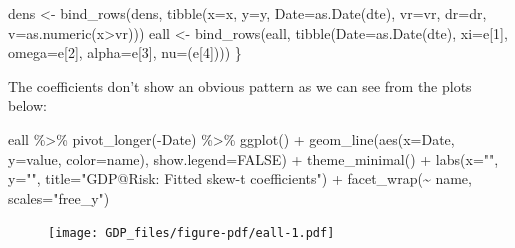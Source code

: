 \documentclass[
  letterpaper,
]{book}
\newenvironment{Shaded}{\begin{snugshade}}{\end{snugshade}}
\newcommand{\AttributeTok}[1]{\textcolor[rgb]{0.40,0.45,0.13}{#1}}
\newcommand{\ConstantTok}[1]{\textcolor[rgb]{0.56,0.35,0.01}{#1}}
\newcommand{\DecValTok}[1]{\textcolor[rgb]{0.68,0.00,0.00}{#1}}
\newcommand{\FunctionTok}[1]{\textcolor[rgb]{0.28,0.35,0.67}{#1}}
\newcommand{\NormalTok}[1]{\textcolor[rgb]{0.00,0.23,0.31}{#1}}
\newcommand{\OtherTok}[1]{\textcolor[rgb]{0.00,0.23,0.31}{#1}}
\newcommand{\SpecialCharTok}[1]{\textcolor[rgb]{0.37,0.37,0.37}{#1}}
\newcommand{\StringTok}[1]{\textcolor[rgb]{0.13,0.47,0.30}{#1}}
\begin{document}
\begin{Shaded}
\begin{Highlighting}[]
\NormalTok{  dens }\OtherTok{\textless{}{-}} \FunctionTok{bind\_rows}\NormalTok{(dens, }\FunctionTok{tibble}\NormalTok{(}\AttributeTok{x=}\NormalTok{x,   }
                                 \AttributeTok{y=}\NormalTok{y,  }
                                 \AttributeTok{Date=}\FunctionTok{as.Date}\NormalTok{(dte),}
                                 \AttributeTok{vr=}\NormalTok{vr, }
                                 \AttributeTok{dr=}\NormalTok{dr,}
                                 \AttributeTok{v=}\FunctionTok{as.numeric}\NormalTok{(x}\SpecialCharTok{\textgreater{}}\NormalTok{vr)))}
\NormalTok{  eall }\OtherTok{\textless{}{-}} \FunctionTok{bind\_rows}\NormalTok{(eall, }\FunctionTok{tibble}\NormalTok{(}\AttributeTok{Date=}\FunctionTok{as.Date}\NormalTok{(dte), }\AttributeTok{xi=}\NormalTok{e[}\DecValTok{1}\NormalTok{], }\AttributeTok{omega=}\NormalTok{e[}\DecValTok{2}\NormalTok{], }\AttributeTok{alpha=}\NormalTok{e[}\DecValTok{3}\NormalTok{], }\AttributeTok{nu=}\NormalTok{(e[}\DecValTok{4}\NormalTok{])))}
\NormalTok{\}}
\end{Highlighting}
\end{Shaded}

The coefficients don't show an obvious pattern as we can see from the
plots below:

\begin{Shaded}
\begin{Highlighting}[]
\NormalTok{eall }\SpecialCharTok{\%\textgreater{}\%}
  \FunctionTok{pivot\_longer}\NormalTok{(}\SpecialCharTok{{-}}\NormalTok{Date) }\SpecialCharTok{\%\textgreater{}\%}
  \FunctionTok{ggplot}\NormalTok{() }\SpecialCharTok{+} 
  \FunctionTok{geom\_line}\NormalTok{(}\FunctionTok{aes}\NormalTok{(}\AttributeTok{x=}\NormalTok{Date, }\AttributeTok{y=}\NormalTok{value, }\AttributeTok{color=}\NormalTok{name), }\AttributeTok{show.legend=}\ConstantTok{FALSE}\NormalTok{) }\SpecialCharTok{+} 
  \FunctionTok{theme\_minimal}\NormalTok{() }\SpecialCharTok{+} 
  \FunctionTok{labs}\NormalTok{(}\AttributeTok{x=}\StringTok{""}\NormalTok{, }\AttributeTok{y=}\StringTok{""}\NormalTok{, }\AttributeTok{title=}\StringTok{"GDP@Risk: Fitted skew{-}t coefficients"}\NormalTok{) }\SpecialCharTok{+}
  \FunctionTok{facet\_wrap}\NormalTok{(}\SpecialCharTok{\textasciitilde{}}\NormalTok{ name, }\AttributeTok{scales=}\StringTok{"free\_y"}\NormalTok{)}
\end{Highlighting}
\end{Shaded}

\begin{figure}[H]

{\centering \texttt{[image: GDP\_files/figure-pdf/eall-1.pdf]}

}

\end{figure}
\end{document}
